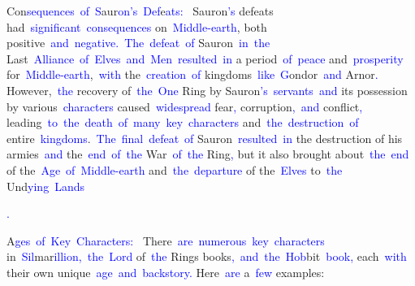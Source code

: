 \documentclass{article}
\begin{document}
\begin{tcolorbox}[colframe=black,colback=white]
{}Con\textcolor{blue}{sequences}\textcolor{blue}{~of}\textcolor{blue}{~S}aur\textcolor{blue}{on}\textcolor{blue}{'s}\textcolor{blue}{~Def}e\textcolor{blue}{ats}\textcolor{blue}{:}\textcolor{blue}{~
}Sauron\textcolor{blue}{'s} defeats had\textcolor{blue}{~significant}\textcolor{blue}{~consequences} on\textcolor{blue}{~Middle}\textcolor{blue}{-earth}, both positive\textcolor{blue}{~and}\textcolor{blue}{~negative}\textcolor{blue}{.}\textcolor{blue}{~The}\textcolor{blue}{~defeat}\textcolor{blue}{~of} Sauron\textcolor{blue}{~in}\textcolor{blue}{~the} Last\textcolor{blue}{~Alliance}\textcolor{blue}{~of}\textcolor{blue}{~Elves}\textcolor{blue}{~and}\textcolor{blue}{~Men}\textcolor{blue}{~resulted}\textcolor{blue}{~in} a period\textcolor{blue}{~of}\textcolor{blue}{~peace} and\textcolor{blue}{~prosperity} for\textcolor{blue}{~Middle}\textcolor{blue}{-earth},\textcolor{blue}{~with} the\textcolor{blue}{~creation}\textcolor{blue}{~of} kingdoms\textcolor{blue}{~like}\textcolor{blue}{~G}ondor\textcolor{blue}{~and} Arnor\textcolor{blue}{.} However,\textcolor{blue}{~the} recovery of\textcolor{blue}{~the}\textcolor{blue}{~One} Ring by Sauron\textcolor{blue}{'s}\textcolor{blue}{~servants}\textcolor{blue}{~and} its possession by various\textcolor{blue}{~characters} caused\textcolor{blue}{~widespread} fear\textcolor{blue}{,} corruption\textcolor{blue}{,}\textcolor{blue}{~and} conflict\textcolor{blue}{,} leading\textcolor{blue}{~to}\textcolor{blue}{~the}\textcolor{blue}{~death}\textcolor{blue}{~of}\textcolor{blue}{~many}\textcolor{blue}{~key}\textcolor{blue}{~characters} and\textcolor{blue}{~the}\textcolor{blue}{~destruction}\textcolor{blue}{~of} entire\textcolor{blue}{~kingdoms}.\textcolor{blue}{~The}\textcolor{blue}{~final}\textcolor{blue}{~defeat}\textcolor{blue}{~of} Sauron\textcolor{blue}{~resulted}\textcolor{blue}{~in} the destruction of his armies\textcolor{blue}{~and} the\textcolor{blue}{~end}\textcolor{blue}{~of}\textcolor{blue}{~the} War\textcolor{blue}{~of}\textcolor{blue}{~the} Ring\textcolor{blue}{,} but it also brought about\textcolor{blue}{~the}\textcolor{blue}{~end} of the\textcolor{blue}{~Age}\textcolor{blue}{~of}\textcolor{blue}{~Middle}\textcolor{blue}{-earth} and\textcolor{blue}{~the}\textcolor{blue}{~departure} of the\textcolor{blue}{~Elves} to\textcolor{blue}{~the} Und\textcolor{blue}{ying}\textcolor{blue}{~Lands}\textcolor{blue}{.

}A\textcolor{blue}{ges}\textcolor{blue}{~of}\textcolor{blue}{~Key}\textcolor{blue}{~Characters}\textcolor{blue}{:}\textcolor{blue}{~
}There\textcolor{blue}{~are}\textcolor{blue}{~numerous}\textcolor{blue}{~key}\textcolor{blue}{~characters} in\textcolor{blue}{~Sil}mar\textcolor{blue}{illion}\textcolor{blue}{,}\textcolor{blue}{~the}\textcolor{blue}{~Lord} of\textcolor{blue}{~the} Rings books\textcolor{blue}{,}\textcolor{blue}{~and}\textcolor{blue}{~the}\textcolor{blue}{~Hob}bit\textcolor{blue}{~book}\textcolor{blue}{,} each\textcolor{blue}{~with} their own unique\textcolor{blue}{~age}\textcolor{blue}{~and}\textcolor{blue}{~backstory}\textcolor{blue}{.} Here\textcolor{blue}{~are} a\textcolor{blue}{~few} examples:\textcolor{blue}{~

}
\end{tcolorbox}
\end{document}
